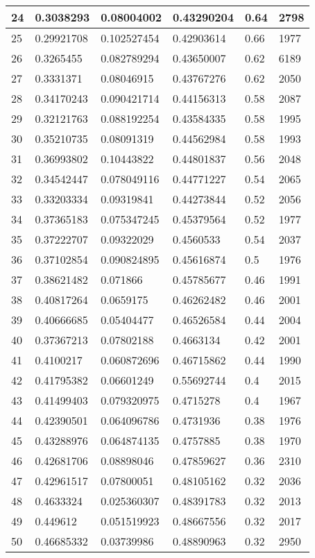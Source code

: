 \begin{longtable}{|l|l|l|l|l|l|}
24 & 0.3038293 & 0.08004002 & 0.43290204 & 0.64 & 2798 \\ \hline 
25 & 0.29921708 & 0.102527454 & 0.42903614 & 0.66 & 1977 \\ \hline 
26 & 0.3265455 & 0.082789294 & 0.43650007 & 0.62 & 6189 \\ \hline 
27 & 0.3331371 & 0.08046915 & 0.43767276 & 0.62 & 2050 \\ \hline 
28 & 0.34170243 & 0.090421714 & 0.44156313 & 0.58 & 2087 \\ \hline 
29 & 0.32121763 & 0.088192254 & 0.43584335 & 0.58 & 1995 \\ \hline 
30 & 0.35210735 & 0.08091319 & 0.44562984 & 0.58 & 1993 \\ \hline 
31 & 0.36993802 & 0.10443822 & 0.44801837 & 0.56 & 2048 \\ \hline 
32 & 0.34542447 & 0.078049116 & 0.44771227 & 0.54 & 2065 \\ \hline 
33 & 0.33203334 & 0.09319841 & 0.44273844 & 0.52 & 2056 \\ \hline 
34 & 0.37365183 & 0.075347245 & 0.45379564 & 0.52 & 1977 \\ \hline 
35 & 0.37222707 & 0.09322029 & 0.4560533 & 0.54 & 2037 \\ \hline 
36 & 0.37102854 & 0.090824895 & 0.45616874 & 0.5 & 1976 \\ \hline 
37 & 0.38621482 & 0.071866 & 0.45785677 & 0.46 & 1991 \\ \hline 
38 & 0.40817264 & 0.0659175 & 0.46262482 & 0.46 & 2001 \\ \hline 
39 & 0.40666685 & 0.05404477 & 0.46526584 & 0.44 & 2004 \\ \hline 
40 & 0.37367213 & 0.07802188 & 0.4663134 & 0.42 & 2001 \\ \hline 
41 & 0.4100217 & 0.060872696 & 0.46715862 & 0.44 & 1990 \\ \hline 
42 & 0.41795382 & 0.06601249 & 0.55692744 & 0.4 & 2015 \\ \hline 
43 & 0.41499403 & 0.079320975 & 0.4715278 & 0.4 & 1967 \\ \hline 
44 & 0.42390501 & 0.064096786 & 0.4731936 & 0.38 & 1976 \\ \hline 
45 & 0.43288976 & 0.064874135 & 0.4757885 & 0.38 & 1970 \\ \hline 
46 & 0.42681706 & 0.08898046 & 0.47859627 & 0.36 & 2310 \\ \hline 
47 & 0.42961517 & 0.07800051 & 0.48105162 & 0.32 & 2036 \\ \hline 
48 & 0.4633324 & 0.025360307 & 0.48391783 & 0.32 & 2013 \\ \hline 
49 & 0.449612 & 0.051519923 & 0.48667556 & 0.32 & 2017 \\ \hline 
50 & 0.46685332 & 0.03739986 & 0.48890963 & 0.32 & 2950 \\ \hline 
\end{longtable}